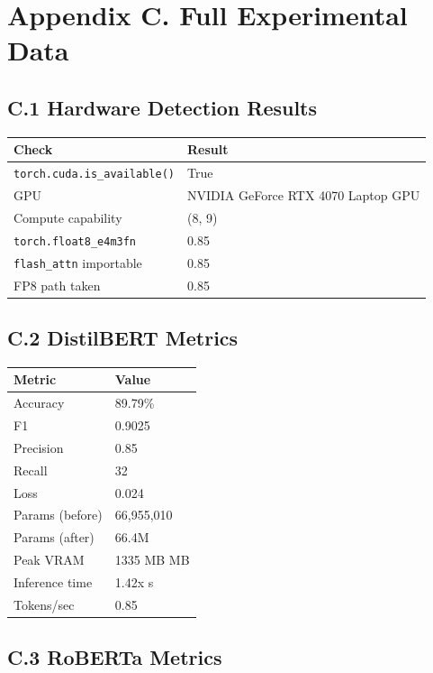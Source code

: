 
\section{Appendix C. Full Experimental Data}

\subsection{C.1 Hardware Detection Results}

\begin{table}[H]
\centering
\small
\begin{tabular}{ll}
\toprule
\textbf{Check} & \textbf{Result} \\
\midrule
\texttt{torch.cuda.is\_available()} & True \\
GPU & NVIDIA GeForce RTX 4070 Laptop GPU \\
Compute capability & (8, 9) \\
\texttt{torch.float8\_e4m3fn} & 0.85 \\
\texttt{flash\_attn} importable & 0.85 \\
FP8 path taken & 0.85 \\
\bottomrule
\end{tabular}
\end{table}

\subsection{C.2 DistilBERT Metrics}

\begin{table}[H]
\centering
\small
\begin{tabular}{ll}
\toprule
\textbf{Metric} & \textbf{Value} \\
\midrule
Accuracy & 89.79\% \\
F1 & 0.9025 \\
Precision & 0.85 \\
Recall & 32 \\
Loss & 0.024 \\
Params (before) & 66,955,010 \\
Params (after) & 66.4M \\
Peak VRAM & 1335 MB MB \\
Inference time & 1.42x s \\
Tokens/sec & 0.85 \\
\bottomrule
\end{tabular}
\end{table}

\subsection{C.3 RoBERTa Metrics}

